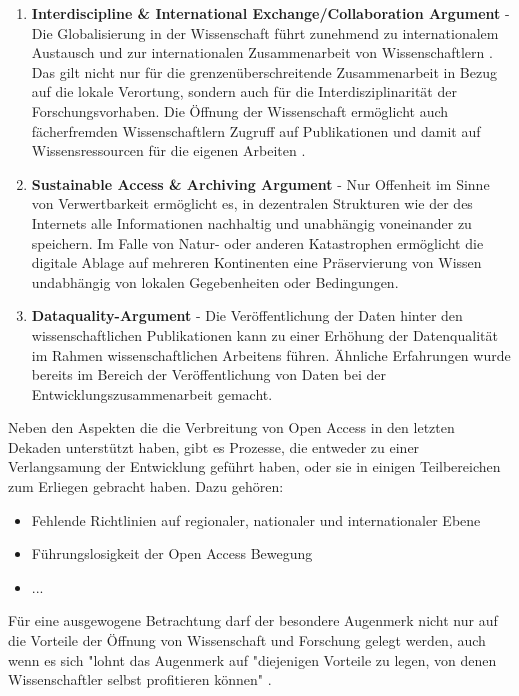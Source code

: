 \begin{enumerate}
\item \textbf{Interdiscipline & International Exchange/Collaboration Argument} - Die Globalisierung in der Wissenschaft führt zunehmend zu internationalem Austausch und zur internationalen Zusammenarbeit von Wissenschaftlern \cite{Waltman_2011}. Das gilt nicht nur für die grenzenüberschreitende Zusammenarbeit in Bezug auf die lokale Verortung, sondern auch für die Interdisziplinarität der Forschungsvorhaben. Die Öffnung der Wissenschaft ermöglicht auch fächerfremden Wissenschaftlern Zugruff auf Publikationen und damit auf Wissensressourcen für die eigenen Arbeiten \cite{suchen}.
\item \textbf{Sustainable Access & Archiving Argument} - Nur Offenheit im Sinne von Verwertbarkeit ermöglicht es, in dezentralen Strukturen wie der des Internets alle Informationen nachhaltig und unabhängig voneinander zu speichern. Im Falle von Natur- oder anderen Katastrophen ermöglicht die digitale Ablage auf mehreren Kontinenten eine Präservierung von Wissen undabhängig von lokalen Gegebenheiten oder Bedingungen.
\item \textbf{Dataquality-Argument} - Die Veröffentlichung der Daten hinter den wissenschaftlichen Publikationen kann zu einer Erhöhung der Datenqualität im Rahmen wissenschaftlichen Arbeitens führen. Ähnliche Erfahrungen wurde bereits im Bereich der Veröffentlichung von Daten bei der Entwicklungszusammenarbeit gemacht\cite{heise_2014_bundestag}.
\end{enumerate}

Neben den Aspekten die die Verbreitung von Open Access in den letzten Dekaden unterstützt haben, gibt es Prozesse, die entweder zu einer Verlangsamung der Entwicklung geführt haben, oder sie in einigen Teilbereichen zum Erliegen gebracht haben. Dazu gehören:

\begin{itemize}
\item Fehlende Richtlinien auf regionaler, nationaler und internationaler Ebene
\item Führungslosigkeit der Open Access Bewegung
\item ...
\end{itemize}

Für eine ausgewogene Betrachtung darf der besondere Augenmerk nicht nur auf die Vorteile der Öffnung von Wissenschaft und Forschung gelegt werden, auch wenn es sich "lohnt das Augenmerk  auf "diejenigen Vorteile zu legen, von denen Wissenschaftler selbst profitieren können" \cite{muller_2010_open}.

